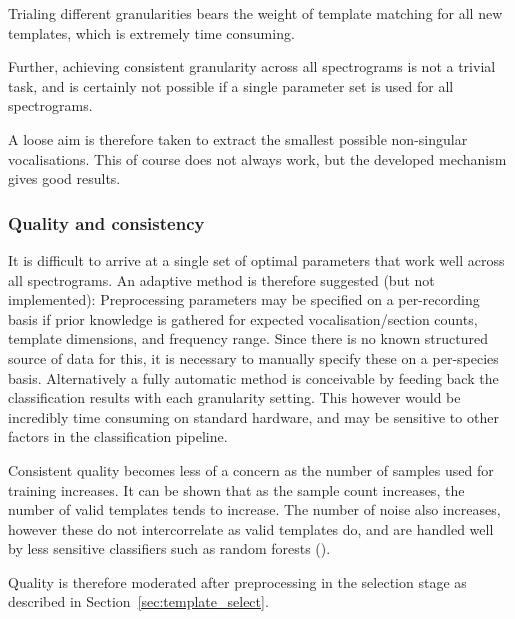 Trialing different granularities bears the weight of template matching for all
new templates, which is extremely time consuming.

Further, achieving consistent granularity across all spectrograms is not a trivial
task, and is certainly not possible if a single parameter set is used for
all spectrograms.

A loose aim is therefore taken to extract the smallest possible non-singular
vocalisations.
This of course does not always work, but the developed mechanism gives good
results.

\subsubsection{Quality and consistency}
It is difficult to arrive at a single set of optimal parameters that work
well across all spectrograms.
An adaptive method is therefore suggested (but not implemented):
Preprocessing parameters may be specified on a per-recording basis if prior
knowledge is gathered for expected vocalisation/section counts, template
dimensions, and frequency range.
Since there is no known structured source of data for this, it is necessary to
manually specify these on a per-species basis.
Alternatively a fully automatic method is conceivable by feeding back the
classification results with each granularity setting.
This however would be incredibly time consuming on standard hardware, and may
be sensitive to other factors in the classification pipeline.

Consistent quality becomes less of a concern as the number of samples used for
training increases.
It can be shown that as the sample count increases, the number of valid templates
tends to increase.
The number of noise also increases, however these do not intercorrelate as valid
templates do, and are handled well by less sensitive classifiers such as
random forests (\textcite{marko2004}).

Quality is therefore moderated after preprocessing in the selection stage as
described in Section~\ref{sec:template_select}.
